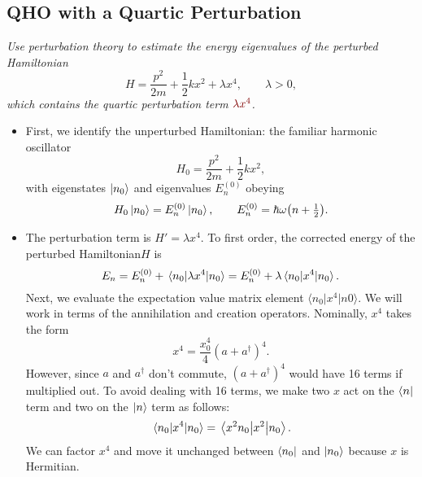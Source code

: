 \documentclass[11pt, a4paper]{article}
\newcommand{\dmath}[1]{\textcolor{Maroon}{#1}}  %
\newcommand{\Ham}{Hamiltonian\xspace}
\newcommand{\bmel}[3]{\big \langle {#1} \big | {#2} \big | {#3} \big \rangle}  %
\begin{document}
\subsection{QHO with a Quartic Perturbation}
\textit{Use perturbation theory to estimate the energy eigenvalues of the perturbed Hamiltonian}
\begin{equation*}
	H = \frac{p^{2}}{2m} + \frac{1}{2}kx^{2} + \lambda x^{4}, \qquad \lambda > 0,
\end{equation*}
\textit{which contains the quartic perturbation term $ \dmath{\lambda x^{4}} $.}

\begin{itemize}
	
	\item First, we identify the unperturbed Hamiltonian: the familiar harmonic oscillator
	\begin{equation*}
		H_{0} = \frac{p^{2}}{2m} + \frac{1}{2}kx^{2},
	\end{equation*}
	with eigenstates $ \ket{n_{0}} $ and eigenvalues $ E^{(0)}_{n} $ obeying
	\begin{equation*}
		H_{0} \ket{n_{0}} = E^{(0)}_{n} \ket{n_{0}}, \qquad E^{(0)}_{n} = \hbar \omega \big(n + \tfrac{1}{2}\big).
	\end{equation*}
	
	\item The perturbation term is $ H' = \lambda x^{4} $. To first order, the corrected energy of the perturbed \Ham $ H $ is
	\begin{equation*}
		E_{n} = E^{(0)}_{n} + \mel{n_{0}}{\lambda x^{4}}{n_{0}} = E^{(0)}_{n} + \lambda \mel{n_{0}}{x^{4}}{n_{0}}.
	\end{equation*}
	Next, we evaluate the expectation value matrix element $ \bmel{n_{0}}{x^{4}}{n0} $. We will work in terms of the annihilation and creation operators. Nominally, $ x^{4} $ takes the form
	\begin{equation*}
		x^{4} = \frac{x_{0}^{4}}{4}(a+a^{\dagger})^{4}.
	\end{equation*}
	However, since $ a $ and $ a^{\dagger} $ don't commute, $ (a+a^{\dagger})^{4} $ would have 16 terms if multiplied out.  To avoid dealing with 16 terms, we make two $ x $ act on the $ \bra{n} $ term and two on the $ \ket{n} $ term as follows:
	\begin{equation*}
		\mel{n_{0}}{x^{4}}{n_{0}} = \mel{x^{2}n_{0}}{x^{2}}{n_{0}}.
	\end{equation*}
	We can factor $ x^{4} $ and move it unchanged between $ \bra{n_{0}} $ and $ \ket{n_{0}} $ because $ x $ is Hermitian.
	

\end{itemize}
\end{document}
